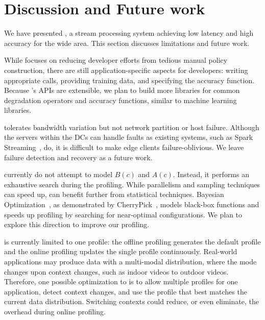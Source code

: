 \section{Discussion and Future work}
\label{sec:discussion}

We have presented \sysname{}, a stream processing system achieving low latency
and high accuracy for the wide area. This section discusses limitations and
future work.

 While \sysname{} focuses on reducing
developer efforts from tedious manual policy construction, there are still
application-specific aspects for developers: writing appropriate \maybe{} calls,
providing training data, and specifying the accuracy function. Because
\sysname{}'s APIs are extensible, we plan to build more libraries for common
degradation operators and accuracy functions, similar to machine learning
libraries.

 \sysname{} tolerates bandwidth
variation but not network partition or host failure. Although the servers within
the DCs can handle faults as existing systems, such as Spark
Streaming~\cite{zaharia2013discretized}, do, it is difficult to make edge
clients failure-oblivious.  We leave failure detection and recovery as a future
work.

 \sysname{} currently do not attempt to model $B(c)$
and $A(c)$. Instead, it performs an exhaustive search during the
profiling. While parallelism and sampling techniques can speed up, \sysname{}
can benefit further from statistical techniques. Bayesian
Optimization~\cite{snoek2012practical}, as demonstrated by
CherryPick~\cite{alipourfard2017cherrypick}, models black-box functions and
speeds up profiling by searching for near-optimal configurations. We plan to
explore this direction to improve our profiling.


 \sysname{} is currently limited to one profile: the
offline profiling generates the default profile and the online profiling updates
the single profile continuously.  Real-world applications may produce data with
a multi-modal distribution, where the mode changes upon context changes, such as
indoor videos to outdoor videos. Therefore, one possible optimization to
\sysname{} is to allow multiple profiles for one application, detect context
changes, and use the profile that best matches the current data distribution.
Switching contexts could reduce, or even eliminate, the overhead during online
profiling.

